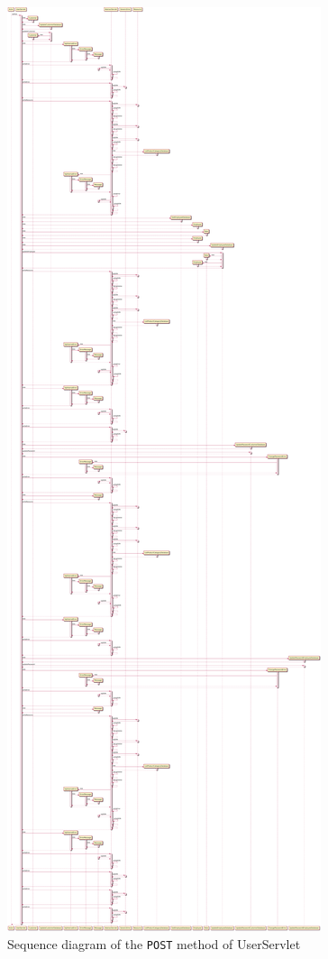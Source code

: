 \begin{figure}[H]
    \centering
    \includegraphics[width=\textwidth,height=0.95\textheight,keepaspectratio]{Schemas/UserServlet_doPost.svg.pdf}
    \caption{Sequence diagram of the \texttt{POST} method of UserServlet}
    \label{fig:UserServlet_doPost}
\end{figure}


